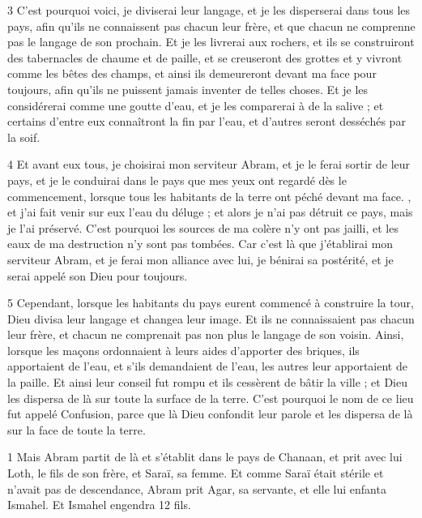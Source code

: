 \par 3 C'est pourquoi voici, je diviserai leur langage, et je les disperserai dans tous les pays, afin qu'ils ne connaissent pas chacun leur frère, et que chacun ne comprenne pas le langage de son prochain. Et je les livrerai aux rochers, et ils se construiront des tabernacles de chaume et de paille, et se creuseront des grottes et y vivront comme les bêtes des champs, et ainsi ils demeureront devant ma face pour toujours, afin qu'ils ne puissent jamais inventer de telles choses. Et je les considérerai comme une goutte d'eau, et je les comparerai à de la salive ; et certains d'entre eux connaîtront la fin par l'eau, et d'autres seront desséchés par la soif.

\par 4 Et avant eux tous, je choisirai mon serviteur Abram, et je le ferai sortir de leur pays, et je le conduirai dans le pays que mes yeux ont regardé dès le commencement, lorsque tous les habitants de la terre ont péché devant ma face. , et j'ai fait venir sur eux l'eau du déluge ; et alors je n'ai pas détruit ce pays, mais je l'ai préservé. C'est pourquoi les sources de ma colère n'y ont pas jailli, et les eaux de ma destruction n'y sont pas tombées. Car c'est là que j'établirai mon serviteur Abram, et je ferai mon alliance avec lui, je bénirai sa postérité, et je serai appelé son Dieu pour toujours.

\par 5 Cependant, lorsque les habitants du pays eurent commencé à construire la tour, Dieu divisa leur langage et changea leur image. Et ils ne connaissaient pas chacun leur frère, et chacun ne comprenait pas non plus le langage de son voisin. Ainsi, lorsque les maçons ordonnaient à leurs aides d'apporter des briques, ils apportaient de l'eau, et s'ils demandaient de l'eau, les autres leur apportaient de la paille. Et ainsi leur conseil fut rompu et ils cessèrent de bâtir la ville ; et Dieu les dispersa de là sur toute la surface de la terre. C'est pourquoi le nom de ce lieu fut appelé Confusion, parce que là Dieu confondit leur parole et les dispersa de là sur la face de toute la terre.


\par 1 Mais Abram partit de là et s'établit dans le pays de Chanaan, et prit avec lui Loth, le fils de son frère, et Saraï, sa femme. Et comme Saraï était stérile et n'avait pas de descendance, Abram prit Agar, sa servante, et elle lui enfanta Ismahel. Et Ismahel engendra 12 fils.

